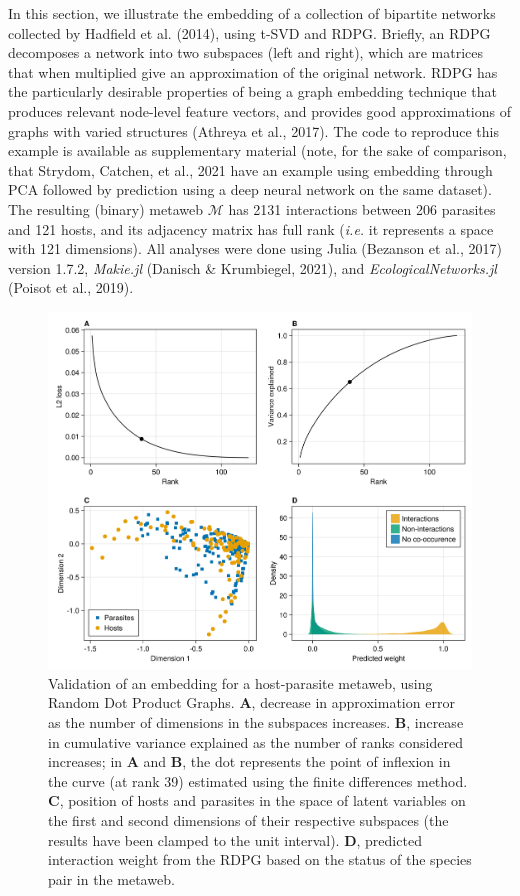 \documentclass[11pt]{article}
\makeatletter
\def\maxwidth{\ifdim\Gin@nat@width>\linewidth\linewidth
\else\Gin@nat@width\fi}
\let\Oldincludegraphics\includegraphics
\renewcommand{\includegraphics}[1]{\Oldincludegraphics[width=\maxwidth]{#1}}
\makeatother
\begin{document}
In this section, we illustrate the embedding of a collection of
bipartite networks collected by Hadfield et al. (2014), using t-SVD and
RDPG. Briefly, an RDPG decomposes a network into two subspaces (left and
right), which are matrices that when multiplied give an approximation of
the original network. RDPG has the particularly desirable properties of
being a graph embedding technique that produces relevant node-level
feature vectors, and provides good approximations of graphs with varied
structures (Athreya et al., 2017). The code to reproduce this example is
available as supplementary material (note, for the sake of comparison,
that Strydom, Catchen, et al., 2021 have an example using embedding
through PCA followed by prediction using a deep neural network on the
same dataset). The resulting (binary) metaweb \(\mathcal{M}\) has 2131
interactions between 206 parasites and 121 hosts, and its adjacency
matrix has full rank (\emph{i.e.} it represents a space with 121
dimensions). All analyses were done using Julia (Bezanson et al., 2017)
version 1.7.2, \emph{Makie.jl} (Danisch \& Krumbiegel, 2021), and
\emph{EcologicalNetworks.jl} (Poisot et al., 2019).

\begin{figure}
\hypertarget{fig:illustration1}{%
\centering
\includegraphics{figures/illustration-part1.png}
\caption{Validation of an embedding for a host-parasite metaweb, using
Random Dot Product Graphs. \textbf{A}, decrease in approximation error
as the number of dimensions in the subspaces increases. \textbf{B},
increase in cumulative variance explained as the number of ranks
considered increases; in \textbf{A} and \textbf{B}, the dot represents
the point of inflexion in the curve (at rank 39) estimated using the
finite differences method. \textbf{C}, position of hosts and parasites
in the space of latent variables on the first and second dimensions of
their respective subspaces (the results have been clamped to the unit
interval). \textbf{D}, predicted interaction weight from the RDPG based
on the status of the species pair in the
metaweb.}\label{fig:illustration1}
}
\end{figure}
\end{document}
